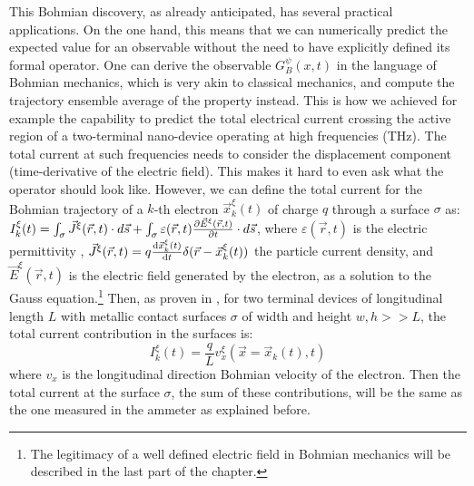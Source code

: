 \documentclass[11pt, a4paper]{article} %
\begin{document}
This Bohmian discovery, as already anticipated, has several practical applications. On the one hand, this means that we can numerically predict the expected value for an observable without the need to have explicitly defined its formal operator. One can derive the observable $G^\psi_B(x,t)$ in the language of Bohmian mechanics, which is very akin to classical mechanics, and compute the trajectory ensemble average of the property instead. This is how we achieved for example the capability to predict the total electrical current crossing the active region of a two-terminal nano-device operating at high frequencies (THz). The total current at such frequencies needs to consider the displacement component (time-derivative of the electric field). This makes it hard to even ask what the operator should look like. However, we can define the total current for the Bohmian trajectory of a $k$-th electron $\vec{x}_k^\xi(t)$ of charge $q$ through a surface $\sigma$ as: $I_k^\xi(t)=\int_\sigma \vec{J}^\xi(\vec{r},t)\cdot d\vec{s}+\int_\sigma \varepsilon(\vec{r},t)\pdv{\vec{E}^\xi(\vec{r},t)}{t}\cdot d\vec{s}$, where $\varepsilon(\vec{r},t)$ is the electric permittivity , $\vec{J}^\xi(\vec{r},t)=q\dv{\vec{x}_k^\xi(t)}{t}\delta(\vec{r}-\vec{x}_k^\xi(t))$ the particle current density, and $\vec{E}^\xi(\vec{r},t)$ is the electric field generated by the electron, as a solution to the Gauss equation.\footnote{The legitimacy of a well defined electric field in Bohmian mechanics will be described in the last part of the chapter.} Then, as proven in \cite{}, for two terminal devices of longitudinal length $L$ with metallic contact surfaces $\sigma$ of width and height $w,h>>L$, the total current contribution in the surfaces is:
\begin{equation}
I^\xi_k(t)=\frac{q}{L}v_x^\xi(\vec{x}=\vec{x}_k(t), t)
\end{equation} 
where $v_x$ is the longitudinal direction Bohmian velocity of the electron. Then the total current at the surface $\sigma$, the sum of these contributions, will be the same as the one measured in the ammeter as explained before. 
\end{document}
